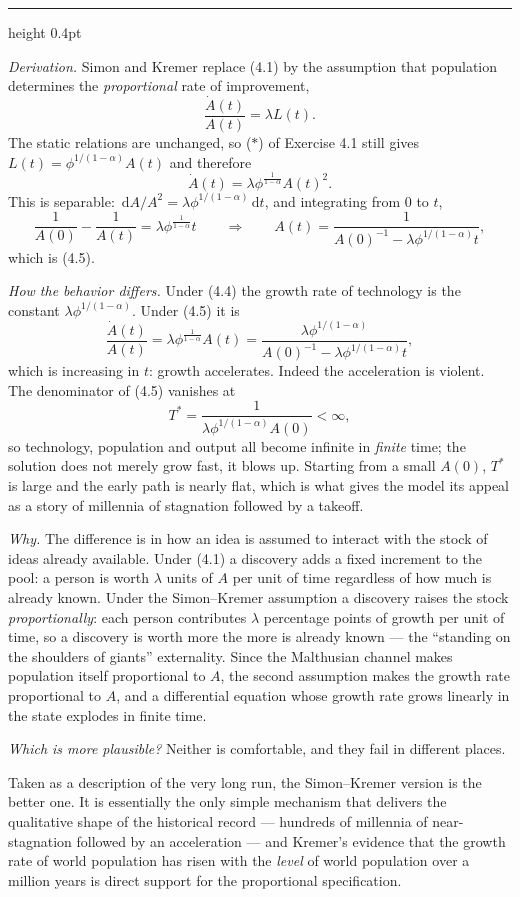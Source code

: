 \documentclass[11pt,letterpaper,reqno]{amsart}
\makeatletter
\newcommand{\dd}{\,\mathrm{d}}
\newcommand{\dt}[1]{\dot{#1}}
\newcommand{\as@head}[3]{%
  \par\addvspace{1.6ex}\penalty-200\relax
  \phantomsection
  \addcontentsline{toc}{subsection}{#1 #2\texorpdfstring{\ifx\relax#3\relax\else\quad #3\fi}{}}%
  {\color{RuleGrey}\hrule height 0.4pt}%
  \nobreak\vspace{0.8ex}\nobreak
  \noindent{\bfseries #1 #2}%
  \ifx\relax#3\relax\else\quad{\bfseries\itshape #3}\fi
  \par\nobreak\vspace{0.4ex}\nobreak
  \as@beginstatement
}
\newcommand{\as@beginstatement}{\begingroup\itshape\ignorespaces}
\newenvironment{aex}[2]{\as@head{Exercise}{#1}{#2}}{\par\addvspace{1.2ex}}
\newcommand{\bk}[1]{\textup{\textsc{#1}}}
\renewcommand{\as@beginstatement}{\ignorespaces}
\makeatother
\begin{document}
\begin{aex}{4.2}{}
\emph{Derivation.}  Simon and Kremer replace \bk{(4.1)} by the assumption that population determines the
\emph{proportional} rate of improvement,
\[
\frac{\dt A(t)}{A(t)}=\lambda L(t).
\]
The static relations are unchanged, so ($*$) of Exercise 4.1 still gives
$L(t)=\phi^{1/(1-\alpha)}A(t)$ and therefore
\[
\dt A(t)=\lambda\phi^{\frac{1}{1-\alpha}}A(t)^{2}.
\]
This is separable: $\dd A/A^{2}=\lambda\phi^{1/(1-\alpha)}\dd t$, and integrating from $0$ to $t$,
\[
\frac{1}{A(0)}-\frac{1}{A(t)}=\lambda\phi^{\frac{1}{1-\alpha}}t
\qquad\Longrightarrow\qquad
A(t)=\frac{1}{A(0)^{-1}-\lambda\phi^{1/(1-\alpha)}t} ,
\]
which is \bk{(4.5)}.

\emph{How the behavior differs.}  Under \bk{(4.4)} the growth rate of technology is the constant
$\lambda\phi^{1/(1-\alpha)}$.  Under \bk{(4.5)} it is
\[
\frac{\dt A(t)}{A(t)}=\lambda\phi^{\frac{1}{1-\alpha}}A(t)
=\frac{\lambda\phi^{1/(1-\alpha)}}{A(0)^{-1}-\lambda\phi^{1/(1-\alpha)}t},
\]
which is increasing in $t$: growth accelerates.  Indeed the acceleration is violent.  The denominator of
\bk{(4.5)} vanishes at
\[
T^{*}=\frac{1}{\lambda\phi^{1/(1-\alpha)}A(0)}<\infty ,
\]
so technology, population and output all become infinite in \emph{finite} time; the solution does not
merely grow fast, it blows up.  Starting from a small $A(0)$, $T^{*}$ is large and the early path is nearly
flat, which is what gives the model its appeal as a story of millennia of stagnation followed by a takeoff.

\emph{Why.}  The difference is in how an idea is assumed to interact with the stock of ideas already
available.  Under \bk{(4.1)} a discovery adds a fixed increment to the pool: a person is worth $\lambda$
units of $A$ per unit of time regardless of how much is already known.  Under the Simon--Kremer assumption a
discovery raises the stock \emph{proportionally}: each person contributes $\lambda$ percentage points of
growth per unit of time, so a discovery is worth more the more is already known --- the ``standing on the
shoulders of giants'' externality.  Since the Malthusian channel makes population itself proportional to
$A$, the second assumption makes the growth rate proportional to $A$, and a differential equation whose
growth rate grows linearly in the state explodes in finite time.

\emph{Which is more plausible?}  Neither is comfortable, and they fail in different places.

Taken as a description of the very long run, the Simon--Kremer version is the better one.  It is
essentially the only simple mechanism that delivers the qualitative shape of the historical record ---
hundreds of millennia of near-stagnation followed by an acceleration --- and Kremer's evidence that the
growth rate of world population has risen with the \emph{level} of world population over a million years is
direct support for the proportional specification.


\end{aex}
\end{document}
